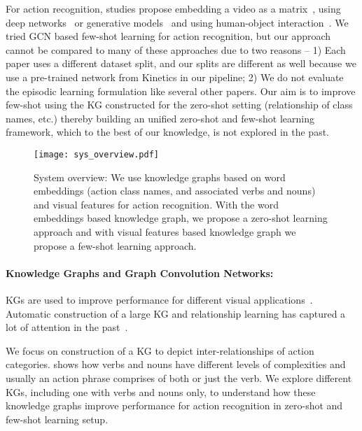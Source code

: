 For action recognition, studies propose embedding a video as a matrix~\cite{fl_v2,fl_v1}, using deep networks~\cite{fl_v3} or generative models~\cite{fl_v5,fl_v3} and using human-object interaction~\cite{comp_lr}. We tried GCN based few-shot learning for action recognition, but our approach cannot be compared to many of these approaches due to two reasons -- 1) Each paper uses a different dataset split, and our splits are different as well because we use a pre-trained network from Kinetics in our pipeline; 2) We do not evaluate the episodic learning formulation like several other papers. Our aim is to improve few-shot using the KG constructed for the zero-shot setting (relationship of class names, etc.) thereby building an unified zero-shot and few-shot learning framework, which to the best of our knowledge, is not explored in the past.


\begin{figure*}
\centering
\texttt{[image: sys\_overview.pdf]}
\caption{System overview: We use knowledge graphs based on word embeddings (action class names, and associated verbs and nouns) and visual features for action recognition. With the word embeddings based knowledge graph, we propose a zero-shot learning approach and with visual features based knowledge graph we propose a few-shot learning approach.}
\label{fig:system}

\end{figure*}


\paragraph{\bf Knowledge Graphs and Graph Convolution Networks:}





KGs are used to improve performance for different visual applications~\cite{marino2016more,fang2017object}. Automatic construction of a large KG and relationship learning has captured a lot of attention in the past~\cite{bordes2014constructing,choudhury2017nous,gao2019know,lin2015learning}. 


We focus on construction of a KG to depict inter-relationships of action categories. \cite{verb_noun} shows how verbs and nouns have different levels of complexities and usually an action phrase comprises of both or just the verb. We explore different KGs, including one with verbs and nouns only, to understand how these knowledge graphs improve performance for action recognition in zero-shot and few-shot learning setup.


